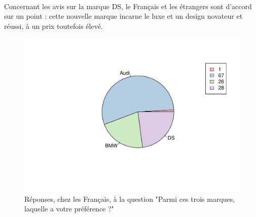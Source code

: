 \documentclass[12pt]{article}\usepackage[]{graphicx}\usepackage[]{color}
\makeatletter
\def\maxwidth{ %
  \ifdim\Gin@nat@width>\linewidth
    \linewidth
  \else
    \Gin@nat@width
  \fi
}
\newenvironment{knitrout}{}{} %
\makeatother
\begin{document}
%
%

\paragraph{} Concernant les avis sur la marque DS, le Français et les étrangers
sont d'accord sur un point : cette nouvelle marque incarne le luxe et un
design novateur et réussi, à un prix toutefois élevé.

\begin{knitrout}
\color{fgcolor}\begin{figure}[H]
\includegraphics[width=\maxwidth]{figure/preference_fr-1} \caption[Réponses, chez les Français, à la question "Parmi ces trois marques, laquelle a votre préférence ?"]{Réponses, chez les Français, à la question "Parmi ces trois marques, laquelle a votre préférence ?"}\label{fig:preference fr}

\end{figure}


\end{knitrout}
\end{document}
